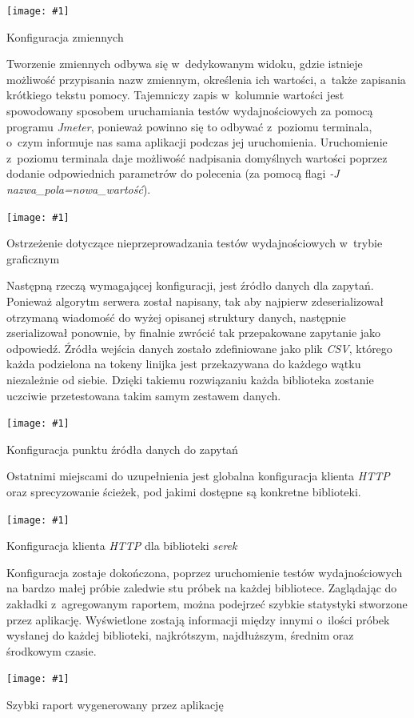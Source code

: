 \documentclass[12pt]{article}
\newcommand{\n}{\newline}
\newcommand{\putss}[3]{
\begin{screenshot}[H]
	\centering
	\texttt{[image: \#1]}
	\caption{#2}
	\label{#3}
	\medskip
\end{screenshot}
}
\newcommand{\nonpl}[1]{{\it #1}}
\newcommand{\code}[1]{{\it #1}}
\newcommand{\HTTP}{\nonpl{HTTP} }
\newcommand{\Jmeter}{\nonpl{Jmeter}\texttrademark}
\newcommand{\serek}{\nonpl{serek}}
\begin{document}
{{{				\putss{./img/jmeter_ss/variables.png}{ Konfiguracja zmiennych}{jmeter_var_config}

				Tworzenie zmiennych odbywa się w~dedykowanym widoku, gdzie istnieje możliwość przypisania nazw zmiennym, określenia ich wartości, a~także zapisania krótkiego
				tekstu pomocy. Tajemniczy zapis w~kolumnie wartości jest spowodowany sposobem uruchamiania testów wydajnościowych za pomocą programu \Jmeter,
				ponieważ powinno się to odbywać z~poziomu terminala, o~czym informuje nas sama aplikacji podczas jej uruchomienia. Uruchomienie z~poziomu terminala daje możliwość
				nadpisania domyślnych wartości poprzez dodanie odpowiednich parametrów do polecenia (za pomocą flagi \code{-J nazwa\_pola=nowa\_wartość}).\n

				\putss{./img/jmeter_ss/jmeter_gui_warn.png}{ Ostrzeżenie dotyczące nieprzeprowadzania testów wydajnościowych w~trybie graficznym}{jmeter_warn}

				Następną rzeczą wymagającej konfiguracji, jest źródło danych dla zapytań. Ponieważ algorytm serwera został napisany, tak aby najpierw zdeserializował otrzymaną
				wiadomość do wyżej opisanej struktury danych, następnie zserializował ponownie, by finalnie zwrócić tak przepakowane zapytanie jako odpowiedź. Źródła wejścia danych
				zostało zdefiniowane jako plik \nonpl{CSV}, którego każda podzielona na tokeny linijka jest przekazywana do każdego wątku niezależnie od siebie. Dzięki takiemu rozwiązaniu
				każda biblioteka zostanie uczciwie przetestowana takim samym zestawem danych.\n


				\putss{./img/jmeter_ss/csv_config.png}{ Konfiguracja punktu źródła danych do zapytań}{jmeter_config_csv}

				Ostatnimi miejscami do uzupełnienia jest globalna konfiguracja klienta \HTTP oraz sprecyzowanie ścieżek, pod jakimi dostępne są konkretne biblioteki.

				\putss{./img/jmeter_ss/http_serek_config.png}{ Konfiguracja klienta \HTTP dla biblioteki \serek}{jmeter_config_http}

				Konfiguracja zostaje dokończona, poprzez uruchomienie testów wydajnościowych na bardzo małej próbie zaledwie stu próbek
				na każdej bibliotece. Zaglądając do zakładki z~agregowanym raportem, można podejrzeć szybkie statystyki stworzone przez aplikację. Wyświetlone
				zostają informacji między innymi o~ilości próbek wysłanej do każdej biblioteki, najkrótszym, najdłuższym, średnim oraz środkowym czasie.

				\putss{./img/jmeter_ss/aggregate_report.png}{ Szybki raport wygenerowany przez aplikację}{jmeter_report}
			}

}}
\end{document}
